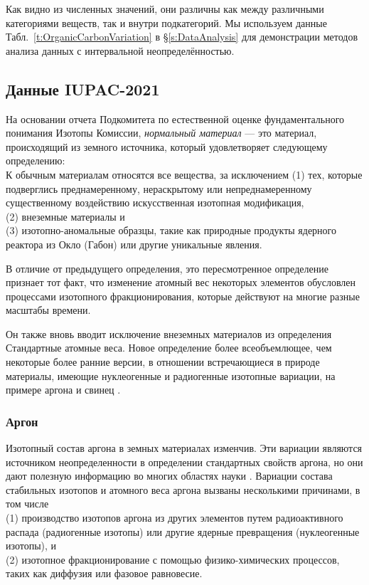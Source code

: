 \documentclass[a5paper,openany]{book}
\begin{document}
Как видно из численных значений, они различны как между различными категориями веществ, так и внутри подкатегорий. Мы используем данные Табл.~\ref{t:OrganicCarbonVariation} в \S\ref{s:DataAnalysis} для демонстрации методов анализа данных с интервальной неопределённостью.



\subsection{Данные IUPAC-2021}

На основании отчета Подкомитета по естественной оценке фундаментального понимания
Изотопы Комиссии, \emph{нормальный материал} — это материал, происходящий из земного источника, который
удовлетворяет следующему определению: \\ 
К обычным материалам относятся все вещества, за исключением 
(1) тех, которые подверглись преднамеренному, нераскрытому или непреднамеренному существенному воздействию искусственная изотопная модификация, \\
(2) внеземные материалы и \\
(3) изотопно-аномальные образцы, такие как природные продукты ядерного реактора из Окло (Габон) или другие уникальные явления.

В отличие от предыдущего определения, это пересмотренное определение признает тот факт, что изменение
атомный вес некоторых элементов обусловлен процессами изотопного фракционирования, которые действуют на многие разные масштабы времени.

Он также вновь вводит исключение внеземных материалов из определения Стандартные атомные веса. Новое определение более всеобъемлющее, чем некоторые более ранние версии, в отношении
встречающиеся в природе материалы, имеющие нуклеогенные и радиогенные изотопные вариации, на примере аргона
\cite{IUPACArgon} и свинец \cite{IUPACLead}.

\subsubsection{Аргон} \label{s:Argon}

Изотопный состав аргона в земных материалах изменчив. Эти вариации являются источником неопределенности в определении стандартных свойств аргона, но они дают полезную информацию во многих областях науки \cite{IUPACArgon}. Вариации состава стабильных изотопов и атомного веса аргона вызваны несколькими причинами, в том числе \\
(1) производство изотопов аргона из других элементов путем радиоактивного распада (радиогенные
изотопы) или другие ядерные превращения (нуклеогенные изотопы), и     \\
(2) изотопное фракционирование с помощью физико-химических процессов, таких как диффузия или фазовое равновесие.  
\end{document}
